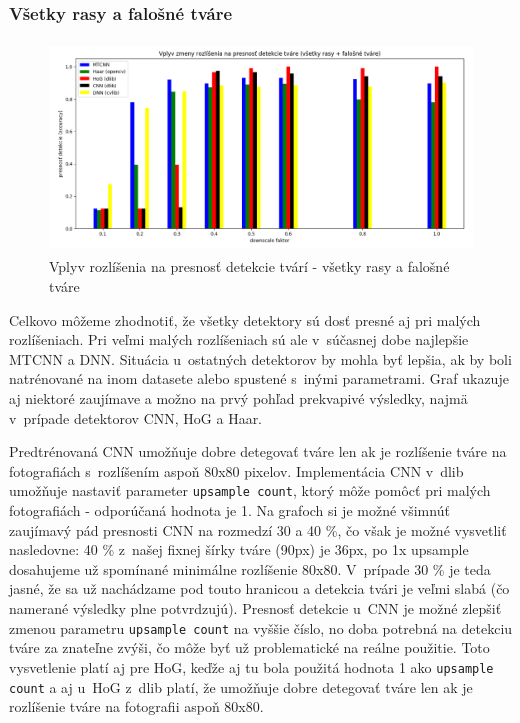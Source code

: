 \documentclass[]{article}
\begin{document}
	\subsubsection*{Všetky rasy a falošné tváre}
	\begin{figure}[h!]
		\includegraphics[height=5.6cm,width=\textwidth]{Vysledky_rozslisenie/all/Figure_1.png}
		\caption{Vplyv rozlíšenia na presnosť detekcie tvárí \-- všetky rasy a falošné tváre}
	\end{figure}

	Celkovo môžeme zhodnotiť, že všetky detektory sú dosť presné aj pri malých rozlíšeniach. Pri veľmi malých rozlíšeniach sú ale v~súčasnej dobe najlepšie MTCNN a DNN.
	Situácia u~ostatných detektorov by mohla byť lepšia, ak by boli natrénované na inom datasete alebo spustené s~inými parametrami. Graf ukazuje aj niektoré zaujímave a možno na prvý pohľad prekvapivé výsledky, najmä v~prípade detektorov CNN, HoG a Haar. 
	
	Predtrénovaná CNN umožňuje dobre detegovať tváre len ak je rozlíšenie tváre na fotografiách s~rozlíšením aspoň 80x80 pixelov. Implementácia CNN v~dlib umožňuje nastaviť parameter \texttt{upsample count}, ktorý môže pomôcť pri malých fotografiách \-- odporúčaná hodnota je 1. Na grafoch si je možné všimnúť zaujímavý pád presnosti CNN na rozmedzí 30 a 40 \%, čo však je možné vysvetliť nasledovne: 40 \% z~našej fixnej šírky tváre (90px) je 36px, po 1x upsample dosahujeme už spomínané minimálne rozlíšenie 80x80. V~prípade 30 \% je teda jasné, že sa už nachádzame pod touto hranicou a detekcia tvári je veľmi slabá (čo namerané výsledky plne potvrdzujú). Presnosť detekcie u~CNN je možné zlepšiť zmenou parametru \texttt{upsample count} na vyššie číslo, no doba potrebná na detekciu tváre za znateľne zvýši, čo môže byť už problematické na reálne použitie. Toto vysvetlenie platí aj pre HoG, keďže aj tu bola použitá hodnota 1 ako \texttt{upsample count} a aj u~HoG z~dlib platí, že umožňuje dobre detegovať tváre len ak je rozlíšenie tváre na fotografii aspoň 80x80.
\end{document}
